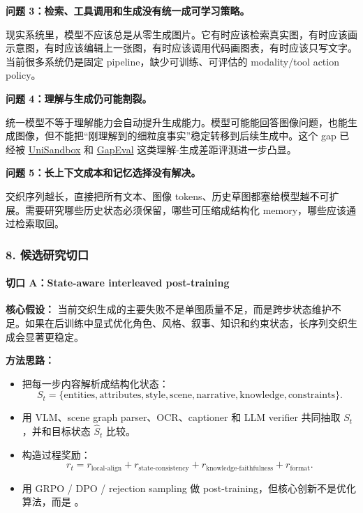 \textbf{问题 3：检索、工具调用和生成没有统一成可学习策略。}

现实系统里，模型不应该总是从零生成图片。它有时应该检索真实图，有时应该画示意图，有时应该编辑上一张图，有时应该调用代码画图表，有时应该只写文字。当前很多系统仍是固定 pipeline，缺少可训练、可评估的 modality/tool action policy。

\textbf{问题 4：理解与生成仍可能割裂。}

统一模型不等于理解能力会自动提升生成能力。模型可能能回答图像问题，也能生成图像，但不能把“刚理解到的细粒度事实”稳定转移到后续生成中。这个 gap 已经被 \href{https://arxiv.org/abs/2511.20561}{UniSandbox} 和 \href{https://arxiv.org/abs/2602.02140}{GapEval} 这类理解-生成差距评测进一步凸显。

\textbf{问题 5：长上下文成本和记忆选择没有解决。}

交织序列越长，直接把所有文本、图像 tokens、历史草图都塞给模型越不可扩展。需要研究哪些历史状态必须保留，哪些可压缩成结构化 memory，哪些应该通过检索取回。

\subsubsection*{8. 候选研究切口}

\paragraph{切口 A：State-aware interleaved post-training}

\textbf{核心假设：} 当前交织生成的主要失败不是单图质量不足，而是跨步状态维护不足。如果在后训练中显式优化角色、风格、叙事、知识和约束状态，长序列交织生成会显著更稳定。

\textbf{方法思路：}

\begin{itemize}[leftmargin=1.5em]
  \item 把每一步内容解析成结构化状态：
\[
S_t = \{\text{entities}, \text{attributes}, \text{style}, \text{scene}, \text{narrative}, \text{knowledge}, \text{constraints}\}.
\]
  \item 用 VLM、scene graph parser、OCR、captioner 和 LLM verifier 共同抽取 \(S_t\)，并和目标状态 \(\hat{S}_t\) 比较。
  \item 构造过程奖励：
\[
r_t = r_\text{local-align} + r_\text{state-consistency} + r_\text{knowledge-faithfulness} + r_\text{format}.
\]
  \item 用 GRPO / DPO / rejection sampling 做 post-training，但核心创新不是优化算法，而是 。
\end{itemize}

